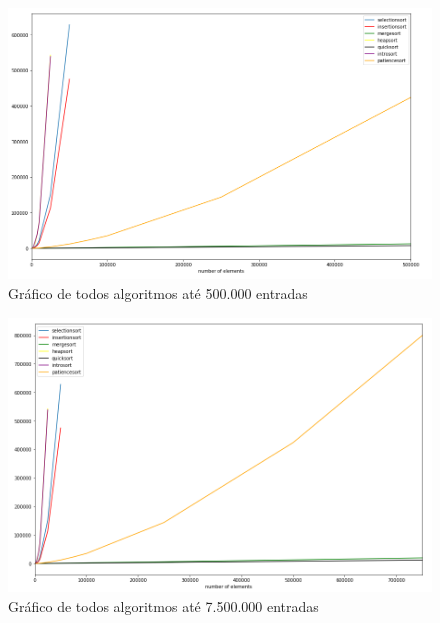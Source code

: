 \documentclass[a4paper,12pt]{scrartcl}
\begin{document}
\begin{figure}[H]
\centering
\includegraphics[scale=.70]{images/todos50.PNG}
\caption{Gráfico de todos algoritmos até 500.000 entradas}
\label{mapaPrincipais}
\end{figure}

\begin{figure}[H]
\centering
\includegraphics[scale=.70]{images/todos75.png}
\caption{Gráfico de todos algoritmos até 7.500.000 entradas}
\label{mapaPrincipais}
\end{figure}
\end{document}
